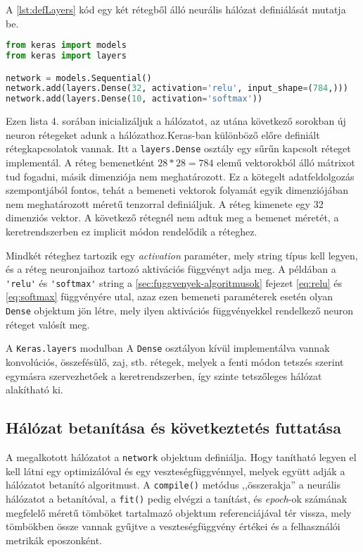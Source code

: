 A \ref{lst:defLayers} kód egy két rétegből álló neurális hálózat definiálását mutatja be.
\begin{minipage}{\linewidth}
\begin{lstlisting}[language=Python, caption=Neurális hálózat rétegeinek definiálása]
from keras import models
from keras import layers

network = models.Sequential()
network.add(layers.Dense(32, activation='relu', input_shape=(784,)))
network.add(layers.Dense(10, activation='softmax'))
\end{lstlisting}\label{lst:defLayers}
\end{minipage}
Ezen lista 4. sorában inicializáljuk a hálózatot, az utána következő sorokban új neuron rétegeket adunk a hálózathoz.Keras-ban különböző előre definiált rétegkapcsolatok vannak. Itt a \verb|layers.Dense| osztály egy sűrűn kapcsolt réteget implementál. %
A réteg bemenetként $28 *28 = 784$ elemű vektorokból álló mátrixot tud fogadni, másik dimenziója nem meghatározott. Ez a kötegelt adatfeldolgozás szempontjából fontos, tehát a bemeneti vektorok folyamát egyik dimenziójában nem meghatározott méretű tenzorral definiáljuk. A réteg kimenete egy 32 dimenziós vektor. A következő rétegnél nem adtuk meg a bemenet méretét, a keretrendszerben ez implicit módon rendelődik a réteghez. 

Mindkét réteghez tartozik egy \emph{activation} paraméter, mely string típus kell legyen, és a réteg neuronjaihoz tartozó aktivációs függvényt adja meg. A példában a \verb|'relu'| és \verb|'softmax'| string a \ref{sec:fuggvenyek-algoritmusok} fejezet \eqref{eq:relu} és \eqref{eq:softmax} függvényére utal, azaz ezen bemeneti paraméterek esetén olyan \verb|Dense| objektum jön létre, mely ilyen aktivációs függvényekkel rendelkező neuron réteget valósít meg.

A \verb|Keras.layers| modulban A \verb|Dense| osztályon kívül implementálva vannak konvolúciós, összefésülő, zaj, stb. rétegek, melyek a fenti módon tetszés szerint egymásra szervezhetőek a keretrendszerben, így szinte tetszőleges hálózat alakítható ki.

\subsection{Hálózat betanítása és következtetés futtatása}

A megalkotott hálózatot a \verb|network| objektum definiálja. Hogy tanítható legyen el kell látni egy optimizálóval és egy veszteségfüggvénnyel, melyek együtt adják a hálózatot betanító algoritmust. A \verb|compile()| metódus ,,összerakja'' a neurális hálózatot a betanítóval, a \verb|fit()| pedig elvégzi a tanítást, és \emph{epoch}-ok számának megfelelő méretű tömböket tartalmazó objektum referenciájával tér vissza, mely tömbökben össze vannak gyűjtve a veszteségfüggvény értékei és a felhasználói metrikák eposzonként. 

